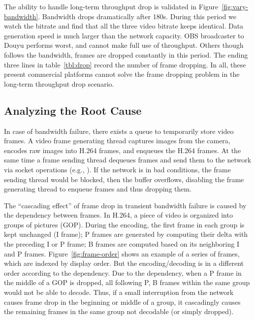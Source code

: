 The ability to handle long-term throughput drop is validated in Figure~\ref{fig:vary-bandwidth}. Bandwidth drops dramatically after 180s. During this period we watch the bitrate and find that all the three video bitrate keeps identical. Data generation speed is much larger than the network capacity. OBS broadcaster to Douyu performs worst, and cannot make full use of throughput. Others though follows the bandwidth, frames are dropped constantly in this period. The ending three lines in table~\ref{tbl:drop} record the number of frame dropping. In all, these present commercial platforms cannot solve the frame dropping problem in the long-term throughput drop scenario.

\subsection{Analyzing the Root Cause}
%
In case of bandwidth failure, there exists a queue to temporarily store video frames. A video frame generating thread captures images from the camera, encodes raw images into H.264 frames, and enqueues the H.264 frames. At the same time a frame sending thread dequeues frames and send them to the network via socket operations (e.g., \mywrite).
If the network is in bad conditions, the frame sending thread would be blocked, then the buffer overflows, disabling the frame generating thread to enqueue frames and thus dropping them.


%
The ``cascading effect'' of frame drop in transient bandwidth failure is caused by the dependency between frames. In H.264, a piece of video is organized into groups of pictures (GOP). During the encoding, the first frame in each group is kept unchanged (I frame); P frames are generated by computing their delta with the preceding I or P frame; B frames are computed based on its neighboring I and P frames. Figure~\ref{fig:frame-order} shows an example of a series of frames, which are indexed by display order. But the encoding/decoding is in a different order according to the dependency. Due to the dependency, when a P frame in the middle of a GOP is dropped, all following P, B frames within the same group would not be able to decode. Thus, if a small interruption from the network causes frame drop in the beginning or middle of a group, it cascadingly causes the remaining frames in the same group not decodable (or simply dropped).

